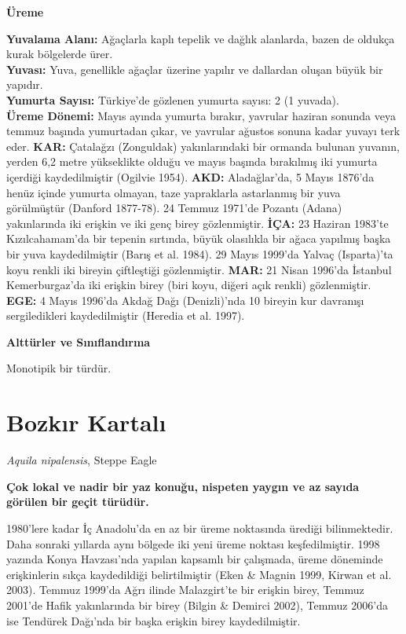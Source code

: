 \documentclass[
  letterpaper,
  DIV=11,
  numbers=noendperiod]{scrreprt}
\begin{document}
\textbf{Üreme}

\textbf{Yuvalama Alanı:} Ağaçlarla kaplı tepelik ve dağlık alanlarda,
bazen de oldukça kurak bölgelerde ürer.\\
\textbf{Yuvası:} Yuva, genellikle ağaçlar üzerine yapılır ve dallardan
oluşan büyük bir yapıdır.\\
\textbf{Yumurta Sayısı:} Türkiye'de gözlenen yumurta sayısı: 2 (1
yuvada).\\
\textbf{Üreme Dönemi:} Mayıs ayında yumurta bırakır, yavrular haziran
sonunda veya temmuz başında yumurtadan çıkar, ve yavrular ağustos sonuna
kadar yuvayı terk eder. \textbf{KAR:} Çatalağzı (Zonguldak)
yakınlarındaki bir ormanda bulunan yuvanın, yerden 6,2 metre yükseklikte
olduğu ve mayıs başında bırakılmış iki yumurta içerdiği kaydedilmiştir
(Ogilvie 1954). \textbf{AKD:} Aladağlar'da, 5 Mayıs 1876'da henüz içinde
yumurta olmayan, taze yapraklarla astarlanmış bir yuva görülmüştür
(Danford 1877-78). 24 Temmuz 1971'de Pozantı (Adana) yakınlarında iki
erişkin ve iki genç birey gözlenmiştir. \textbf{İÇA:} 23 Haziran 1983'te
Kızılcahamam'da bir tepenin sırtında, büyük olasılıkla bir ağaca
yapılmış başka bir yuva kaydedilmiştir (Barış et al. 1984). 29 Mayıs
1999'da Yalvaç (Isparta)'ta koyu renkli iki bireyin çiftleştiği
gözlenmiştir. \textbf{MAR:} 21 Nisan 1996'da İstanbul Kemerburgaz'da iki
erişkin birey (biri koyu, diğeri açık renkli) gözlenmiştir.
\textbf{EGE:} 4 Mayıs 1996'da Akdağ Dağı (Denizli)'nda 10 bireyin kur
davranışı sergiledikleri kaydedilmiştir (Heredia et al. 1997).

\textbf{Alttürler ve Sınıflandırma}

Monotipik bir türdür.

\section{Bozkır Kartalı}\label{bozkux131r-kartalux131}

\emph{Aquila nipalensis}, Steppe Eagle

\textbf{Çok lokal ve nadir bir yaz konuğu, nispeten yaygın ve az sayıda
görülen bir geçit türüdür.}

1980'lere kadar İç Anadolu'da en az bir üreme noktasında ürediği
bilinmektedir. Daha sonraki yıllarda aynı bölgede iki yeni üreme noktası
keşfedilmiştir. 1998 yazında Konya Havzası'nda yapılan kapsamlı bir
çalışmada, üreme döneminde erişkinlerin sıkça kaydedildiği
belirtilmiştir (Eken \& Magnin 1999, Kirwan et al. 2003). Temmuz 1999'da
Ağrı ilinde Malazgirt'te bir erişkin birey, Temmuz 2001'de Hafik
yakınlarında bir birey (Bilgin \& Demirci 2002), Temmuz 2006'da ise
Tendürek Dağı'nda bir başka erişkin birey kaydedilmiştir.
\end{document}
